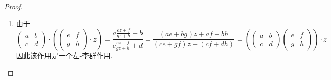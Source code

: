 \documentclass[../main.tex]{subfiles}
\begin{document}
\begin{proof}
   \begin{enumerate}
    \item [a).]
    由于 \[
  \begin{pmatrix} 
        a&b\\ 
         c&d 
    \end{pmatrix} \cdot \left(   \begin{pmatrix} 
        e&f\\ 
         g&h 
    \end{pmatrix}\cdot z  \right)= \frac{a\frac{ez+ f }{gz+ h }+ b  }{c\frac{ez+ f }{gz+ h }+ d  }= \frac{\left( ae+ bg \right)z+ af+ bh  }{\left( ce+ gf \right)z+ \left( cf+ dh \right)   }= \left(\begin{pmatrix} 
        a&b\\ 
         c&d 
    \end{pmatrix} \begin{pmatrix} 
        e&f\\ 
         g&h 
    \end{pmatrix}   \right)\cdot z    
    \]因此该作用是一个左-李群作用.
    

\end{enumerate}
\end{proof}
\end{document}
